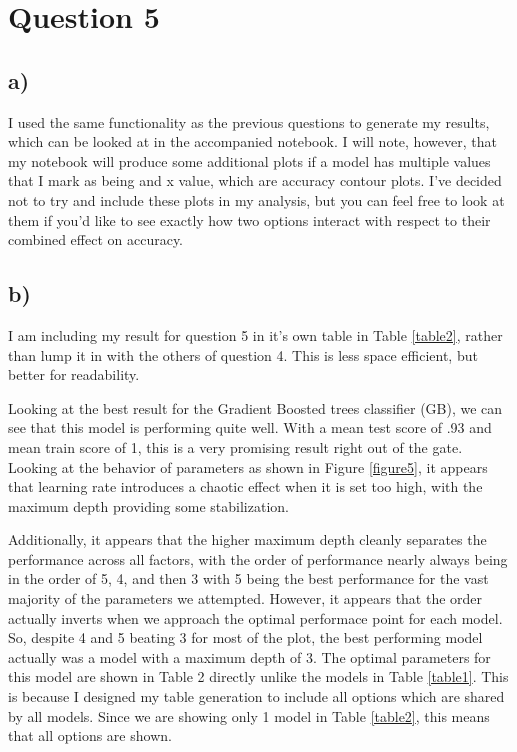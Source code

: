 \documentclass[12pt]{article}
\begin{document}
\section{Question 5}
\subsection{a)}
I used the same functionality as the previous questions to generate my results, which can be looked at in the accompanied
notebook. I will note, however, that my notebook will produce some additional plots if a model has multiple values that 
I mark as being and x value, which are accuracy contour plots. I've decided not to try and include these plots in my 
analysis, but you can feel free to look at them if you'd like to see exactly how two options interact with respect to 
their combined effect on accuracy.

\subsection{b)}
I am including my result for question 5 in it's own table in Table \ref{table2}, rather than lump it in with the others of question 
4. This is less space efficient, but better for readability.

Looking at the best result for the Gradient Boosted trees classifier (GB), we can see that this model is performing 
quite well. With a mean test score of .93 and mean train score of 1, this is a very promising result right out of the gate.
Looking at the behavior of parameters as shown in Figure \ref{figure5}, it appears that learning rate introduces a chaotic effect
when it is set too high, with the maximum depth providing some stabilization. 

Additionally, it appears that the higher maximum depth cleanly separates the performance across all factors, with the
order of performance nearly always being in the order of 5, 4, and then 3 with 5 being the best performance for the vast
majority of the parameters we attempted. However, it appears that the order actually inverts when we approach the optimal
performace point for each model. So, despite 4 and 5 beating 3 for most of the plot, the best performing model actually 
was a model with a maximum depth of 3. The optimal
parameters for this model are shown in Table 2 directly unlike the models in Table \ref{table1}. This is because I designed my table generation to include 
all options which are shared by all models. Since we are showing only 1 model in Table \ref{table2}, this means that all options are shown.
\end{document}
